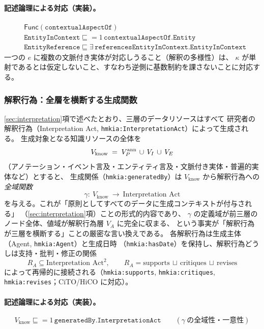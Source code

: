 \paragraph{記述論理による対応（実装）。}
\begin{align*}
  &\mathsf{Func}(\texttt{contextualAspectOf}) \\
  &\texttt{EntityInContext} \sqsubseteq
     {=}1\,\texttt{contextualAspectOf}.\texttt{Entity} \\
  &\texttt{EntityReference} \sqsubseteq
     \exists\,\texttt{referencesEntityInContext}.\texttt{EntityInContext}
\end{align*}
一つの $e$ に複数の文脈付き実体が対応しうること（解釈の多様性）は、
$\kappa$ が単射であるとは仮定しないこと、すなわち逆側に基数制約を課さないことに対応する。

\subsubsection*{解釈行為：全層を横断する生成関数}

\ref{sec:interpretation}項で述べたとおり、三層のデータリソースはすべて
研究者の解釈行為（Interpretation Act, \texttt{hmkia:InterpretationAct}）によって生成される。
生成対象となる知識リソースの全体を
\[
  V_{\mathrm{know}} \;=\; V_P^{\text{\upshape ann}} \,\cup\, V_I \,\cup\, V_E
\]
（アノテーション・イベント言及・エンティティ言及・文脈付き実体・普遍的実体など）とすると、
生成関係（\texttt{hmkia:generatedBy}）は $V_{\mathrm{know}}$ から解釈行為への
\emph{全域関数}
\[
  \gamma:\ V_{\mathrm{know}} \ \longrightarrow\ \text{Interpretation Act}
\]
を与える。これが「原則としてすべてのデータに生成コンテキストが付与される」
（\ref{sec:interpretation}項）ことの形式的内容であり、
$\gamma$ の定義域が前三層のノード全体、値域が解釈行為層 $V_A$ に完全に収まる、
という事実が「解釈行為が三層を横断する」ことの厳密な言い換えである。
各解釈行為は生成主体（Agent, \texttt{hmkia:Agent}）と生成日時
（\texttt{hmkia:hasDate}）を保持し、解釈行為どうしは支持・批判・修正の関係
\[
  R_A \subseteq \text{Interpretation Act}^2,
  \qquad
  R_A = \mathrm{supports} \,\sqcup\, \mathrm{critiques} \,\sqcup\, \mathrm{revises}
\]
によって再帰的に接続される（\texttt{hmkia:supports}, \texttt{hmkia:critiques},
\texttt{hmkia:revises}；CiTO/HiCO に対応）。

\paragraph{記述論理による対応（実装）。}
\[
  V_{\mathrm{know}} \sqsubseteq
     {=}1\,\texttt{generatedBy}.\texttt{InterpretationAct}
  \qquad(\gamma\ \text{の全域性・一意性})
\]

